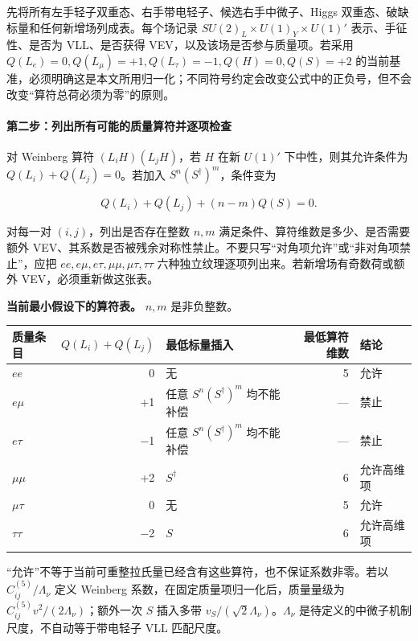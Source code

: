 \documentclass[
  chinese,
  UTF8]{ctexart}
\newcounter{none} %
\begin{document}
先将所有左手轻子双重态、右手带电轻子、候选右手中微子、Higgs
双重态、破缺标量和任何新增场列成表。每个场记录
\(SU(2)_L\times U(1)_Y\times U(1)'\) 表示、手征性、是否为 VLL、是否获得
VEV，以及该场是否参与质量项。若采用
\(Q(L_e)=0,Q(L_\mu)=+1,Q(L_\tau)=-1,Q(H)=0,Q(S)=+2\)
的当前基准，必须明确这是本文所用归一化；不同符号约定会改变公式中的正负号，但不会改变``算符总荷必须为零''的原则。

\paragraph{第二步：列出所有可能的质量算符并逐项检查}\label{ux7b2cux4e8cux6b65ux5217ux51faux6240ux6709ux53efux80fdux7684ux8d28ux91cfux7b97ux7b26ux5e76ux9010ux9879ux68c0ux67e5}

对 Weinberg 算符 \((L_iH)(L_jH)\)，若 \(H\) 在新 \(U(1)'\)
下中性，则其允许条件为 \(Q(L_i)+Q(L_j)=0\)。若加入
\(S^n(S^\dagger)^m\)，条件变为

\[Q(L_i)+Q(L_j)+(n-m)Q(S)=0.\]

对每一对 \((i,j)\)，列出是否存在整数 \(n,m\)
满足条件、算符维数是多少、是否需要额外
VEV、其系数是否被残余对称性禁止。不要只写``对角项允许''或``非对角项禁止''，应把
\(ee,e\mu,e\tau,\mu\mu,\mu\tau,\tau\tau\)
六种独立纹理逐项列出来。若新增场有奇数荷或额外 VEV，必须重新做这张表。

\textbf{当前最小假设下的算符表。} \(n,m\) 是非负整数。

{\def\LTcaptype{none} %
\begin{longtable}[]{@{}lrlrl@{}}
\toprule\noalign{}
质量条目 & \(Q(L_i)+Q(L_j)\) & 最低标量插入 & 最低算符维数 & 结论 \\
\midrule\noalign{}
\endhead
\bottomrule\noalign{}
\endlastfoot
\(ee\) & 0 & 无 & 5 & 允许 \\
\(e\mu\) & +1 & 任意 \(S^n(S^\dagger)^m\) 均不能补偿 & --- & 禁止 \\
\(e\tau\) & −1 & 任意 \(S^n(S^\dagger)^m\) 均不能补偿 & --- & 禁止 \\
\(\mu\mu\) & +2 & \(S^\dagger\) & 6 & 允许高维项 \\
\(\mu\tau\) & 0 & 无 & 5 & 允许 \\
\(\tau\tau\) & −2 & \(S\) & 6 & 允许高维项 \\
\end{longtable}
}

``允许''不等于当前可重整拉氏量已经含有这些算符，也不保证系数非零。若以
\(C_{ij}^{(5)}/\Lambda_\nu\) 定义 Weinberg
系数，在固定质量项归一化后，质量量级为
\(C_{ij}^{(5)}v^2/(2\Lambda_\nu)\)；额外一次 \(S\) 插入多带
\(v_S/(\sqrt2\Lambda_\nu)\)。\(\Lambda_\nu\)
是待定义的中微子机制尺度，不自动等于带电轻子 VLL 匹配尺度。
\end{document}
